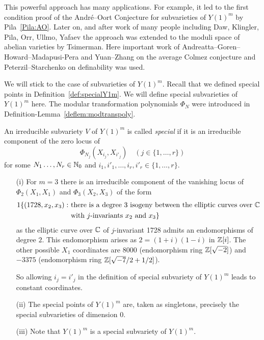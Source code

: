 This powerful approach has many applications. For example, it led to
the first condition proof of the Andr\'e--Oort Conjecture for
subvarieties of $Y(1)^m$ by Pila~\ref{Pila:AO}. Later on, and after work of
many people including Daw, Klingler, Pila, Orr, Ullmo, Yafaev the
approach was extended to the moduli space of abelian varieties by
Tsimerman. Here important work of
Andreatta--Goren--Howard--Madapusi-Pera and Yuan--Zhang on the average
Colmez conjecture and Peterzil--Starchenko on definability was used.

We will stick to the case of subvarieties of $Y(1)^m$.
Recall that we defined special points in
Definition~\ref{def:specialY1m}. We will define special subvarieties
of $Y(1)^m$ here. The modular transformation polynomials $\Phi_N$
were introduced in Definition-Lemma~\ref{deflem:modtranspoly}. 

\begin{definition}
  An irreducible subvariety $V$ of $Y(1)^m$ is called \emph{special} if it is
  an irreducible component of the zero locus of
  \begin{equation*}
    \Phi_{N_j}(X_{i_j},X_{i'_j}) \quad (j\in \{1,\ldots,r\})
  \end{equation*}
  for some  $N_1\ldots,N_r\in{\mathbb{N}}_0$ and $i_1,i'_1,\ldots,i_r,i'_r\in
  \{1,\ldots,r\}$. 
\end{definition}

\begin{example}
  \begin{enumerate}
  \item [(i)]
    For $m=3$ there is an irreducible component of the vanishing locus of
    $\Phi_2(X_1,X_1)$ and $\Phi_3(X_2,X_3)$ of the form
    \begin{alignat*}1
      \{(1728,x_2,x_3) : \,\,&\text{there is a degree $3$ isogeny between
        the elliptic curves over $\IC$}\\ &\text{with $j$-invariants $x_2$ and $x_3$}\}
    \end{alignat*}
    as the elliptic curve over ${\mathbb{C}}$  of $j$-invariant 1728
    admits an endomorphisms of degree $2$. This endomorphism arises as
    $2 = (1+i)(1-i)$ in ${\mathbb{Z}}[i]$. The other possible $X_1$ 
    coordinates are $8000$ (endomorphism ring ${\mathbb{Z}}[\sqrt{-2}]$) and
    $-3375$ (endomorphism ring ${\mathbb{Z}}[\sqrt{-7}/2+1/2]$).

    So allowing $i_j=i'_j$ in the definition of special subvariety of
    $Y(1)^m$ leads to constant coordinates. 
  \item[(ii)] The special points of $Y(1)^m$ are, taken as singletons,
    precisely the special subvarieties of dimension $0$.
  \item[(iii)] Note that $Y(1)^m$ is a special subvariety of $Y(1)^m$. 
  \end{enumerate}
\end{example}

